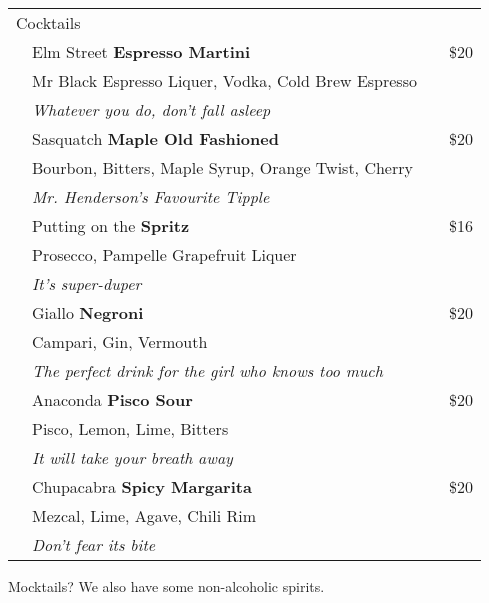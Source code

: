 \documentclass[12pt]{article}
\makeatletter
\newcommand*\ColText[1]{\textcolor{SpringGreen4}{#1}}
\newcommand*\GroupTitle[1]{%
   \multicolumn{2}{l}{\fontsize{20}{29}\selectfont\ColText{#1}}\\[0.8em]}
\newenvironment{Group}
  {\vspace{2em}\noindent\begin{tabular*}{\textwidth}{@{} p{10mm} l@{\extracolsep{\fill}} r@{\hspace{1em}} r@{}}} %
  {\end{tabular*}}
\newcommand*\Cocktail[3]{%
  \noalign{\vspace{2em}}
  \vspace{0.5mm} %
  \fontfamily{qzc}\selectfont #2 & #1 \tiny\dotfill & \tiny\dotfill & \normalsize \$#3}
\newcommand*\Expl[1]{%
  {} & \hspace*{0.1em} \scriptsize #1}
\newcommand*\Glass[2]{%
    \begin{tikzpicture}[remember picture,overlay]
        \node[xshift=5mm,yshift=0mm]{%
            \texttt{[image: Glasses/\#1.png]}
        };
    \end{tikzpicture}%
}
\newcommand*\GlassFlute{%
    \Glass{flute}{3mm}}
\newcommand*\GlassMartini{%
    \Glass{martini}{7mm}}
\newcommand*\GlassOldFashioned{%
    \Glass{old_fashioned}{6mm}}
\makeatother
\begin{document}
\begin{Group}
    \GroupTitle{Cocktails}
    \Cocktail{Elm Street \textbf{Espresso Martini}}{\GlassMartini}{20} \\
    \Expl{Mr Black Espresso Liquer, Vodka, Cold Brew Espresso} \\
    \Expl{\it Whatever you do, don't fall asleep} \\
    \Cocktail{Sasquatch \textbf{Maple Old Fashioned}}{\GlassOldFashioned}{20} \\
    \Expl{Bourbon, Bitters, Maple Syrup, Orange Twist, Cherry} \\
    \Expl{\it Mr. Henderson's Favourite Tipple} \\
    \Cocktail{Putting on the \textbf{Spritz}}{\GlassFlute}{16} \\
    \Expl{Prosecco, Pampelle Grapefruit Liquer} \\
    \Expl{\it It's super-duper} \\
    \Cocktail{Giallo \textbf{Negroni}}{\GlassOldFashioned}{20} \\
    \Expl{Campari, Gin, Vermouth} \\
    \Expl{\it The perfect drink for the girl who knows too much} \\
    \Cocktail{Anaconda \textbf{Pisco Sour}}{\GlassOldFashioned}{20} \\
    \Expl{Pisco, Lemon, Lime, Bitters} \\
    \Expl{\it It will take your breath away} \\
    \Cocktail{Chupacabra \textbf{Spicy Margarita}}{\GlassOldFashioned}{20} \\
    \Expl{Mezcal, Lime, Agave, Chili Rim} \\
    \Expl{\it Don't fear its bite} \\
\end{Group}
\vfill
\begin{center}
	Mocktails? We also have some non-alcoholic spirits.
\end{center}
\pagebreak
\end{document}
